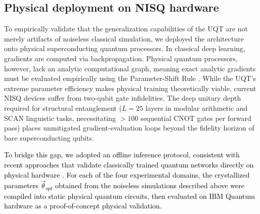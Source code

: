 \documentclass[11pt, a4paper]{article}
\begin{document}
\subsection*{Physical deployment on NISQ hardware}
To empirically validate that the generalization capabilities of the UQT are not merely artifacts of noiseless classical simulation, we deployed the architecture onto physical superconducting quantum processors. In classical deep learning, gradients are computed via backpropagation. Physical quantum processors, however, lack an analytic computational graph, meaning exact analytic gradients must be evaluated empirically using the Parameter-Shift Rule \cite{mitarai2018quantum, schuld2019evaluating}. While the UQT's extreme parameter efficiency makes physical training theoretically viable, current NISQ devices suffer from two-qubit gate infidelities. The deep unitary depth required for structural entanglement ($L = 25$ layers in modular arithmetic and SCAN linguistic tasks, necessitating $>100$ sequential CNOT gates per forward pass) places unmitigated gradient-evaluation loops beyond the fidelity horizon of bare superconducting qubits.

\textcolor{black}{To bridge this gap, we adopted an offline inference protocol, consistent with recent approaches that validate classically trained quantum networks directly on physical hardware \cite{lakhdar2025benchmarking}. For each of the four experimental domains, the crystallized parameters $\vec{\theta}_{opt}$ obtained from the noiseless simulations described above were compiled into static physical quantum circuits, then evaluated on IBM Quantum hardware as a proof-of-concept physical validation.}
\end{document}
